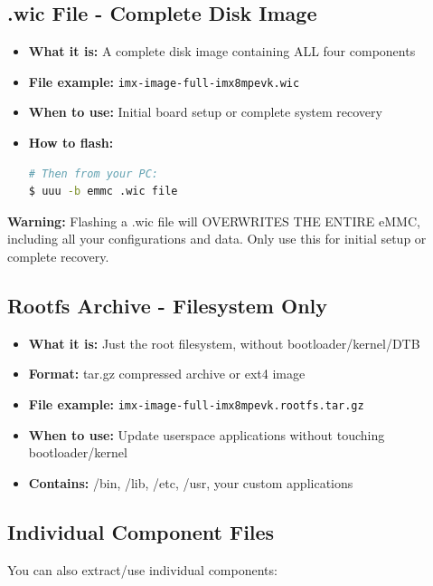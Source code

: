 \documentclass[12pt,a4paper]{report}
\begin{document}
\subsection{.wic File - Complete Disk Image}

\begin{itemize}
    \item \textbf{What it is:} A complete disk image containing ALL four components
    \item \textbf{File example:} \texttt{imx-image-full-imx8mpevk.wic}
    \item \textbf{When to use:} Initial board setup or complete system recovery
    \item \textbf{How to flash:}
    \begin{lstlisting}[language=bash]
# Then from your PC:
$ uuu -b emmc .wic file 
    \end{lstlisting}
\end{itemize}

\begin{important}
\textbf{Warning:} Flashing a .wic file will OVERWRITES THE ENTIRE eMMC, including all your configurations and data. Only use this for initial setup or complete recovery.
\end{important}

\subsection{Rootfs Archive - Filesystem Only}

\begin{itemize}
    \item \textbf{What it is:} Just the root filesystem, without bootloader/kernel/DTB
    \item \textbf{Format:} tar.gz compressed archive or ext4 image
    \item \textbf{File example:} \texttt{imx-image-full-imx8mpevk.rootfs.tar.gz}
    \item \textbf{When to use:} Update userspace applications without touching bootloader/kernel
    \item \textbf{Contains:} /bin, /lib, /etc, /usr, your custom applications
\end{itemize}

\subsection{Individual Component Files}

You can also extract/use individual components:
\end{document}
